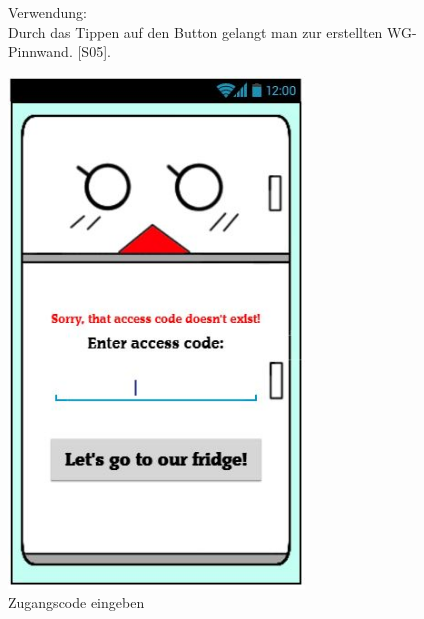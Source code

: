 \documentclass[a4paper]{scrreprt}
\begin{document}
\begin{figure}[h]
\begin{minipage}[b]{0.55\linewidth}
\begin{itemize}
    			\end{itemize}
    		
    			\hfill
    			
    			Verwendung:\\
    			Durch das Tippen auf den Button gelangt man
    			zur erstellten WG-Pinnwand. {[}S05{]}.
    			
    			\vspace{38mm}
    			
    		\end{minipage}
    	\end{figure}
    	
    	\begin{figure}[h!]
    		\begin{minipage}[t]{0.4\linewidth}
    			\flushright
    			\centering
    			\vspace{9mm}
    			\includegraphics[width=0.7\textwidth]{fridget_accesscodeenter.JPG}
    			\caption{Zugangscode eingeben}
    			\label{fig:figure1}
    		\end{minipage}
    		\hspace{0.5cm}

\end{figure}
\end{document}
